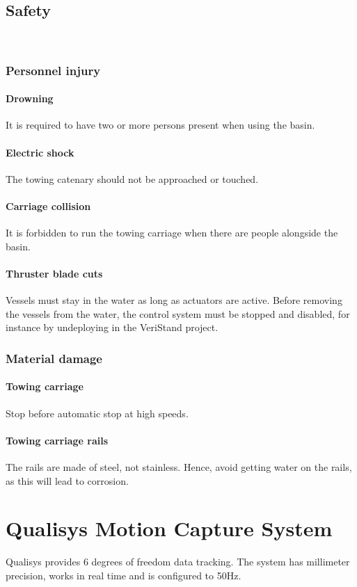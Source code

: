 \documentclass[a4paper,english]{report}
\begin{document}
\subsection{Safety}\
\subsubsection{Personnel injury}
\paragraph{Drowning}
It is required to have two or more persons present when using the basin.
\paragraph{Electric shock}
The towing catenary should not be approached or touched.
\paragraph{Carriage collision}
It is forbidden to run the towing carriage when there are people alongside the basin.
\paragraph{Thruster blade cuts}
Vessels must stay in the water as long as actuators are active. Before removing the vessels from the water, the control system must be stopped and disabled, for instance by undeploying in the VeriStand project.

\subsubsection{Material damage}
\paragraph{Towing carriage}
Stop before automatic stop at high speeds.
\paragraph{Towing carriage rails}
The rails are made of steel, not stainless. Hence, avoid getting water on the rails, as this will lead to corrosion. 

\clearpage{}

\section{Qualisys Motion Capture System}
Qualisys provides 6 degrees of freedom data tracking. The system has millimeter precision, works in real time and is configured to 50Hz.
\end{document}
